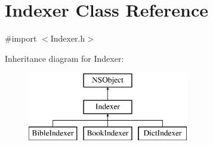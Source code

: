 \hypertarget{interface_indexer}{\section{Indexer Class Reference}
\label{interface_indexer}
}


{\ttfamily \#import $<$Indexer.\-h$>$}

Inheritance diagram for Indexer\-:\begin{figure}[H]
\begin{center}
\leavevmode
\includegraphics[height=3.000000cm]{interface_indexer}
\end{center}
\end{figure}
